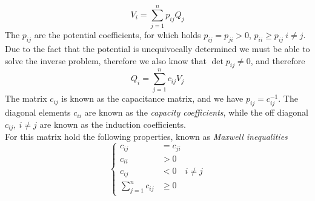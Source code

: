 \documentclass[../electromagnetism]{subfiles}
\begin{document}
\begin{equation}
	V_i=\sum_{j=1}^np_{ij}Q_j
	\label{eq:potcoef}
\end{equation}
The $p_{ij}$ are the potential coefficients, for which holds $p_{ij}=p_{ji}>0$, $p_{ii}\ge p_{ij}\ i\ne j$.\\
Due to the fact that the potential is unequivocally determined we must be able to solve the inverse problem, therefore we also know that $\det p_{ij}\ne0$, and therefore
\begin{equation}
	Q_i=\sum_{j=1}^nc_{ij}V_j
	\label{eq:capcoef}
\end{equation}
The matrix $c_{ij}$ is known as the capacitance matrix, and we have $p_{ij}=c^{-1}_{ij}$. The diagonal elements $c_{ii}$ are known as the \textit{capacity coefficients}, while the off diagonal $c_{ij},\ i\ne j$ are known as the induction coefficients.\\
For this matrix hold the following properties, known as \textit{Maxwell inequalities}
\begin{equation}
	\left\{\begin{aligned}
		c_{ij}&=c_{ji}\\
		c_{ii}&>0\\
		c_{ij}&<0\quad i\ne j\\
		\sum_{j=1}^nc_{ij}&\ge0
	\end{aligned}\right.
	\label{eq:maxwelldis}
\end{equation}
\end{document}
